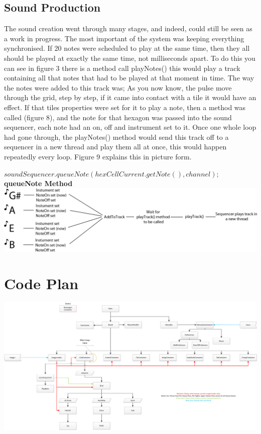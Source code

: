 \documentclass[10pt,a4paper]{article}
\begin{document}
\subsection{Sound Production}
The sound creation went through many stages, and indeed, could still be seen as a work in progress. The most important of the system was keeping everything synchronised. If 20 notes were scheduled to play at the same time, then they all should be played at exactly the same time, not milliseconds apart. To do this you can see in figure 3 there is a method call playNotes() this would play a track containing all that notes that had to be played at that moment in time. The way the notes were added to this track was; As you now know, the pulse move through the grid, step by step, if it came into contact with a tile it would have an effect. If that tiles properties were set for it to play a note, then a method was called (figure 8), and the note for that hexagon was passed into the sound sequencer, each note had an on, off and instrument set to it. Once one whole loop had gone through, the playNotes() method would send this track off to a sequencer in a new thread and play them all at once, this would happen repeatedly every loop. Figure 9 explains this in picture form. 

\begin{center}

$ soundSequencer.queueNote(hexCellCurrent.getNote(), channel);  $\\

\textbf{queueNote Method}
\medskip 
\includegraphics[scale=0.25]{8.png}
\end{center}

\pagebreak
\section{Code Plan}
\begin{center}
\includegraphics[scale=0.65, angle=270]{plan.png}
\end{center}
\pagebreak
\end{document}
